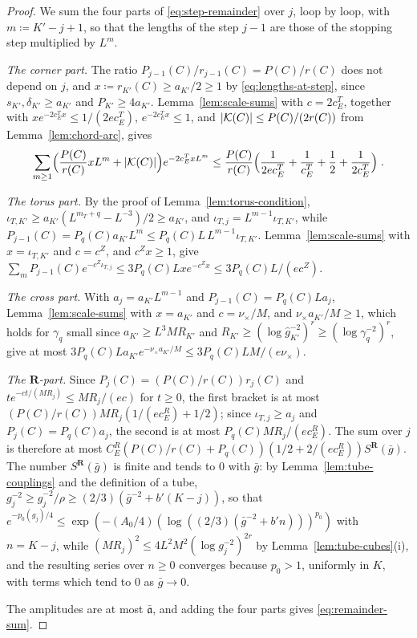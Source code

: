 \documentclass[11pt]{preprint}
\DeclarePairedDelimiter{\abs}{\lvert}{\rvert}
\numberwithin{equation}{section}
\theoremstyle{definition}
\theoremstyle{remark}
\theoremstyle{plain}
\begin{document}
\begin{proof}
We sum the four parts of \eqref{eq:step-remainder} over $j$, loop by loop, with $m \coloneqq K' - j + 1$, so that the lengths of the step $j - 1$ are those of the stopping step multiplied by $L^m$.

\emph{The corner part.} The ratio $P_{j-1}(C)/r_{j-1}(C) = P(C)/r(C)$ does not depend on $j$, and $x \coloneqq r_{K'}(C) \geq a_{K'}/2 \geq 1$ by \eqref{eq:lengths-at-step}, since $s_{K'}, \delta_{K'} \geq a_{K'}$ and $P_{K'} \geq 4a_{K'}$. Lemma~\ref{lem:scale-sums} with $c = 2c^T_E$, together with $xe^{-2c^T_Ex} \leq 1/(2ec^T_E)$, $e^{-2c^T_Ex} \leq 1$, and $\abs{\mathcal K(C)} \leq P(C)/(2r(C))$ from Lemma~\ref{lem:chord-arc}, gives
\begin{equation}\label{eq:corner-part-sum}
    \sum_{m \geq 1}\Bigl(\frac{P(C)}{r(C)}xL^m + \abs{\mathcal K(C)}\Bigr)e^{-2c^T_ExL^m} \leq \frac{P(C)}{r(C)}\Bigl(\frac{1}{2ec^T_E} + \frac{1}{c^T_E} + \frac12 + \frac{1}{2c^T_E}\Bigr)\;.
\end{equation}

\emph{The torus part.} By the proof of Lemma~\ref{lem:torus-condition}, $\iota_{T,K'} \geq a_{K'}(L^{m_T+q} - L^{-3})/2 \geq a_{K'}$, and $\iota_{T,j} = L^{m-1}\iota_{T,K'}$, while $P_{j-1}(C) = P_q(C)a_{K'}L^m \leq P_q(C)L\,L^{m-1}\iota_{T,K'}$. Lemma~\ref{lem:scale-sums} with $x = \iota_{T,K'}$ and $c = c^Z$, and $c^Zx \geq 1$, give $\sum_mP_{j-1}(C)e^{-c^Z\iota_{T,j}} \leq 3P_q(C)Lxe^{-c^Zx} \leq 3P_q(C)L/(ec^Z)$.

\emph{The cross part.} With $a_j = a_{K'}L^{m-1}$ and $P_{j-1}(C) = P_q(C)La_j$, Lemma~\ref{lem:scale-sums} with $x = a_{K'}$ and $c = \nu_\times/M$, and $\nu_\times a_{K'}/M \geq 1$, which holds for $\gamma_q$ small since $a_{K'} \geq L^3MR_{K'}$ and $R_{K'} \geq (\log\hat g_{K'}^{-2})^r \geq (\log\gamma_q^{-2})^r$, give at most $3P_q(C)La_{K'}e^{-\nu_\times a_{K'}/M} \leq 3P_q(C)LM/(e\nu_\times)$.

\emph{The $\mathbf R$-part.} Since $P_j(C) = (P(C)/r(C))r_j(C)$ and $te^{-ct/(MR_j)} \leq MR_j/(ec)$ for $t \geq 0$, the first bracket is at most $(P(C)/r(C))MR_j(1/(ec^R_E) + 1/2)$; since $\iota_{T,j} \geq a_j$ and $P_j(C) = P_q(C)a_j$, the second is at most $P_q(C)MR_j/(ec^R_E)$. The sum over $j$ is therefore at most $C^R_E(P(C)/r(C) + P_q(C))(1/2 + 2/(ec^R_E))S^{\mathbf R}(\bar g)$. The number $S^{\mathbf R}(\bar g)$ is finite and tends to $0$ with $\bar g$: by Lemma~\ref{lem:tube-couplings} and the definition of a tube, $g_j^{-2} \geq \hat g_j^{-2}/\rho \geq (2/3)(\bar g^{-2} + b'(K - j))$, so that $e^{-p_0(g_j)/4} \leq \exp(-(A_0/4)(\log((2/3)(\bar g^{-2} + b'n)))^{p_0})$ with $n = K - j$, while $(MR_j)^2 \leq 4L^2M^2(\log g_j^{-2})^{2r}$ by Lemma~\ref{lem:tube-cubes}(i), and the resulting series over $n \geq 0$ converges because $p_0 > 1$, uniformly in $K$, with terms which tend to $0$ as $\bar g \to 0$.

The amplitudes are at most $\bar{\mathfrak a}$, and adding the four parts gives \eqref{eq:remainder-sum}.
\end{proof}
\end{document}
